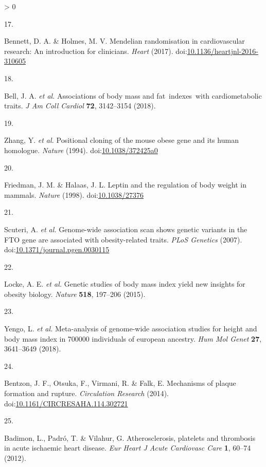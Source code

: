 \documentclass[11pt,twoside]{bristolthesis}
\newlength{\cslhangindent}
\newlength{\csllabelwidth}
\newenvironment{CSLReferences}[2] %
 {%
  \setlength{\parindent}{0pt}
  \ifodd #1 \everypar{\setlength{\hangindent}{\cslhangindent}}\ignorespaces\fi
  \ifnum #2 > 0
  \setlength{\parskip}{#2\baselineskip}
  \fi
 }%
 {}
\newcommand{\CSLLeftMargin}[1]{\parbox[t]{\csllabelwidth}{#1}}
\newcommand{\CSLRightInline}[1]{\parbox[t]{\linewidth - \csllabelwidth}{#1}\break}
\begin{document}
\begin{CSLReferences}{0}{0}
\leavevmode\hypertarget{ref-Bennett2017}{}%
\CSLLeftMargin{17. }
\CSLRightInline{Bennett, D. A. \& Holmes, M. V. Mendelian randomisation in cardiovascular research: An introduction for clinicians. \emph{Heart} (2017). doi:\href{https://doi.org/10.1136/heartjnl-2016-310605}{10.1136/heartjnl-2016-310605}}

\leavevmode\hypertarget{ref-Bell2018}{}%
\CSLLeftMargin{18. }
\CSLRightInline{Bell, J. A. \emph{et al.} Associations of body mass and fat~indexes~with cardiometabolic traits. \emph{J Am Coll Cardiol} \textbf{72}, 3142--3154 (2018).}

\leavevmode\hypertarget{ref-Zhang1994}{}%
\CSLLeftMargin{19. }
\CSLRightInline{Zhang, Y. \emph{et al.} Positional cloning of the mouse obese gene and its human homologue. \emph{Nature} (1994). doi:\href{https://doi.org/10.1038/372425a0}{10.1038/372425a0}}

\leavevmode\hypertarget{ref-Friedman1998}{}%
\CSLLeftMargin{20. }
\CSLRightInline{Friedman, J. M. \& Halaas, J. L. Leptin and the regulation of body weight in mammals. \emph{Nature} (1998). doi:\href{https://doi.org/10.1038/27376}{10.1038/27376}}

\leavevmode\hypertarget{ref-Scuteri2007}{}%
\CSLLeftMargin{21. }
\CSLRightInline{Scuteri, A. \emph{et al.} Genome-wide association scan shows genetic variants in the FTO gene are associated with obesity-related traits. \emph{PLoS Genetics} (2007). doi:\href{https://doi.org/10.1371/journal.pgen.0030115}{10.1371/journal.pgen.0030115}}

\leavevmode\hypertarget{ref-Locke2015}{}%
\CSLLeftMargin{22. }
\CSLRightInline{Locke, A. E. \emph{et al.} Genetic studies of body mass index yield new insights for obesity biology. \emph{Nature} \textbf{518}, 197--206 (2015).}

\leavevmode\hypertarget{ref-Yengo2018}{}%
\CSLLeftMargin{23. }
\CSLRightInline{Yengo, L. \emph{et al.} Meta-analysis of genome-wide association studies for height and body mass index in 700000 individuals of european ancestry. \emph{Hum Mol Genet} \textbf{27}, 3641--3649 (2018).}

\leavevmode\hypertarget{ref-Bentzon2014}{}%
\CSLLeftMargin{24. }
\CSLRightInline{Bentzon, J. F., Otsuka, F., Virmani, R. \& Falk, E. Mechanisms of plaque formation and rupture. \emph{Circulation Research} (2014). doi:\href{https://doi.org/10.1161/CIRCRESAHA.114.302721}{10.1161/CIRCRESAHA.114.302721}}

\leavevmode\hypertarget{ref-Badimon2012}{}%
\CSLLeftMargin{25. }
\CSLRightInline{Badimon, L., Padró, T. \& Vilahur, G. Atherosclerosis, platelets and thrombosis in acute ischaemic heart disease. \emph{Eur Heart J Acute Cardiovasc Care} \textbf{1}, 60--74 (2012).}


\end{CSLReferences}
\end{document}
